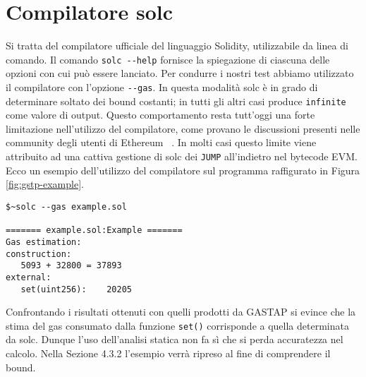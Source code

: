     
\section{Compilatore solc}

Si tratta del compilatore ufficiale del linguaggio Solidity, utilizzabile da linea di comando. Il comando \verb|solc --help| fornisce la spiegazione di ciascuna delle opzioni con cui può essere lanciato.\newline
\indent Per condurre i nostri test abbiamo utilizzato il compilatore con l'opzione \verb|--gas|. In questa modalità solc è in grado di determinare soltato dei bound costanti; in tutti gli altri casi produce \verb|infinite| come valore di output. Questo comportamento resta tutt'oggi una forte limitazione nell'utilizzo del compilatore, come provano le discussioni presenti nelle community degli utenti di Ethereum ~\cite{infinite-gas-github-issue, infinite-gas-stack-exchange, gas-costs-stack-exchange}. In molti casi questo limite viene attribuito ad una cattiva gestione di solc dei \texttt{JUMP} all'indietro nel bytecode EVM.\newline
\indent Ecco un esempio dell'utilizzo del compilatore sul programma raffigurato in Figura \ref{fig:gstp-example}.

\begin{center}
 \begin{minipage}{\linewidth}
\begin{lstlisting}
$~solc --gas example.sol 

======= example.sol:Example =======
Gas estimation:
construction:
   5093 + 32800 = 37893
external:
   set(uint256):	20205

\end{lstlisting}
\end{minipage}
\end{center}

Confrontando i risultati ottenuti con quelli prodotti da GASTAP si evince che la stima del gas consumato dalla funzione \verb|set()| corrisponde a quella determinata da solc. Dunque l'uso dell'analisi statica non fa sì che si perda accuratezza nel calcolo.\newline
\indent Nella Sezione 4.3.2 l'esempio verrà ripreso al fine di comprendere il bound.\newline
